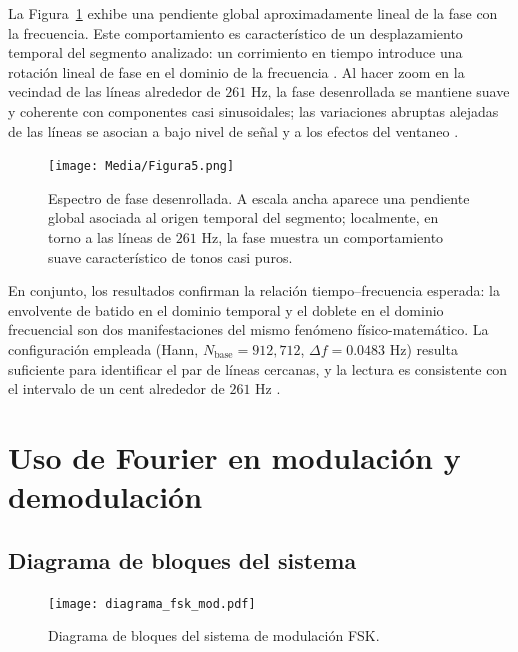 \documentclass[letter,12pt]{article}
\begin{document}
La Figura~\ref{fig:exp1-phase} exhibe una pendiente global aproximadamente lineal de la fase con la frecuencia. Este comportamiento es característico de un desplazamiento temporal del segmento analizado: un corrimiento en tiempo introduce una rotación lineal de fase en el dominio de la frecuencia \cite{OppenheimSchaferDTSP3e,VetterliKovacevicGoyalFSP2014}. Al hacer zoom en la vecindad de las líneas alrededor de \(261\) Hz, la fase desenrollada se mantiene suave y coherente con componentes casi sinusoidales; las variaciones abruptas alejadas de las líneas se asocian a bajo nivel de señal y a los efectos del ventaneo \cite{OppenheimSchaferDTSP3e}.
\begin{figure}[H]
  \centering
  \texttt{[image: Media/Figura5.png]}
  \caption{Espectro de fase desenrollada. A escala ancha aparece una pendiente global asociada al origen temporal del segmento; localmente, en torno a las líneas de \(261\) Hz, la fase muestra un comportamiento suave característico de tonos casi puros.}
  \label{fig:exp1-phase}
\end{figure}  

En conjunto, los resultados confirman la relación tiempo–frecuencia esperada: la envolvente de batido en el dominio temporal y el doblete en el dominio frecuencial son dos manifestaciones del mismo fenómeno físico-matemático. La configuración empleada (Hann, \(N_{\text{base}}=912{,}712\), \(\Delta f=0.0483\) Hz) resulta suficiente para identificar el par de líneas cercanas, y la lectura es consistente con el intervalo de un cent alrededor de \(261\) Hz \cite{OppenheimSchaferDTSP3e,Harris1978Windows}.



\section{Uso de Fourier en modulación y demodulación}

\subsection{Diagrama de bloques del sistema}

\begin{figure}[H]
  \centering
  \texttt{[image: diagrama\_fsk\_mod.pdf]}
  \caption{Diagrama de bloques del sistema de modulación FSK.}
  \label{fig:bloques-mod-fsk}
\end{figure}
\end{document}
